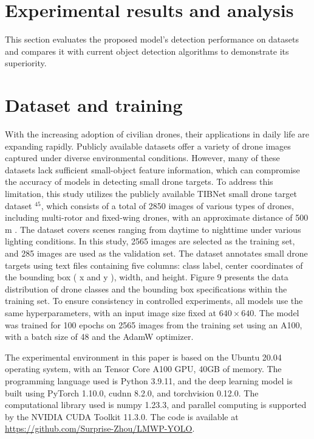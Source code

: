 \documentclass{article}
\begin{document}
\section*{Experimental results and analysis}
This section evaluates the proposed model's detection performance on datasets and compares it with current object detection algorithms to demonstrate its superiority.

\section*{Dataset and training}
With the increasing adoption of civilian drones, their applications in daily life are expanding rapidly. Publicly available datasets offer a variety of drone images captured under diverse environmental conditions. However, many of these datasets lack sufficient small-object feature information, which can compromise the accuracy of models in detecting small drone targets. To address this limitation, this study utilizes the publicly available TIBNet small drone target dataset ${ }^{45}$, which consists of a total of 2850 images of various types of drones, including multi-rotor and fixed-wing drones, with an approximate distance of 500 m . The dataset covers scenes ranging from daytime to nighttime under various lighting conditions. In this study, 2565 images are selected as the training set, and 285 images are used as the validation set. The dataset annotates small drone targets using text files containing five columns: class label, center coordinates of the bounding box ( x and y ), width, and height. Figure 9 presents the data distribution of drone classes and the bounding box specifications within the training set. To ensure consistency in controlled experiments, all models use the same hyperparameters, with an input image size fixed at $640 \times 640$. The model was trained for 100 epochs on 2565 images from the training set using an A100, with a batch size of 48 and the AdamW optimizer.

The experimental environment in this paper is based on the Ubuntu 20.04 operating system, with an Tensor Core A100 GPU, 40GB of memory. The programming language used is Python 3.9.11, and the deep learning model is built using PyTorch 1.10.0, cudnn 8.2.0, and torchvision 0.12.0. The computational library used is numpy 1.23.3, and parallel computing is supported by the NVIDIA CUDA Toolkit 11.3.0. The code is available at \href{https://github.com/Surprise-Zhou/LMWP-YOLO}{https://github.com/Surprise-Zhou/LMWP-YOLO}.
\end{document}

